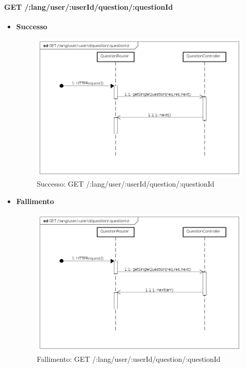 





\paragraph{GET /:lang/user/:userId/question/:questionId}
\begin{itemize}
\item \textbf{Successo}


\begin{figure}[ht]
	\centering
	\includegraphics[scale=0.45]{UML/DiagrammiDiSequenza/Back-end/GET__lang_user__userId_question__questionId_success.png}
	\caption{Successo: GET /:lang/user/:userId/question/:questionId}
\end{figure}
\FloatBarrier

\item \textbf{Fallimento}


\begin{figure}[ht]
	\centering
	\includegraphics[scale=0.45]{UML/DiagrammiDiSequenza/Back-end/GET__lang_user__userId_question__questionId_failure.png}
	\caption{Fallimento: GET /:lang/user/:userId/question/:questionId}
\end{figure}
\FloatBarrier

\end{itemize}






